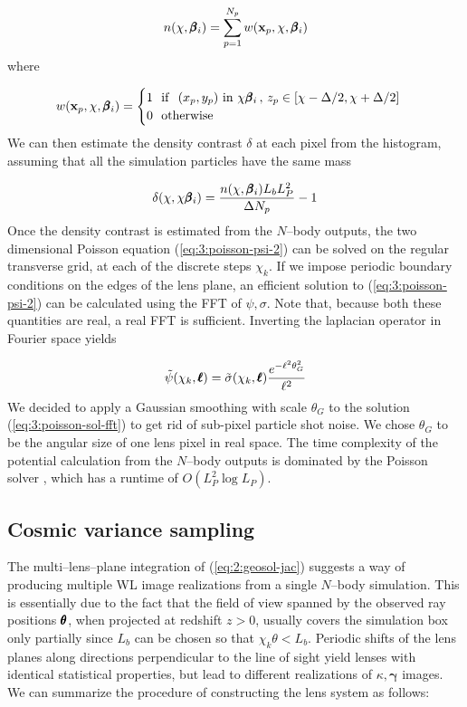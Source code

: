 \begin{equation}
\label{eq:3:number-hist}
n(\chi, \pmb{\beta}_i) = \sum_{p=1}^{N_p}w(\mathbf{x}_p,\chi,\pmb{\beta}_i)
\end{equation}  
%
where 

\begin{equation}
\label{eq:3:number-kernel}
w(\mathbf{x}_p,\chi,\pmb{\beta}_i) = 
\begin{cases}
1 \,\,\,\, {\rm if} \,\,\,\, (x_p,y_p) \,\, {\rm in} \,\, \chi\pmb{\beta}_i \, , \, z_p\in [\chi-\Delta/2,\chi+\Delta/2] \\
0 \,\,\,\, {\rm otherwise}
\end{cases}
\end{equation}
%
We can then estimate the density contrast $\delta$ at each pixel from the histogram, assuming that all the simulation particles have the same mass

\begin{equation}
\label{eq:3:delta-hist}
\delta(\chi,\chi\pmb{\beta}_i) = \frac{n(\chi,\pmb{\beta}_i)L_bL_P^2 }{\Delta N_p} - 1
\end{equation}
%
Once the density contrast is estimated from the $N$--body outputs, the two dimensional Poisson equation (\ref{eq:3:poisson-psi-2}) can be solved on the regular transverse grid, at each of the discrete steps $\chi_k$. If we impose periodic boundary conditions on the edges of the lens plane, an efficient solution to (\ref{eq:3:poisson-psi-2}) can be calculated using the FFT of $\psi,\sigma$. Note that, because both these quantities are real, a real FFT is sufficient. Inverting the laplacian operator in Fourier space yields

\begin{equation}
\label{eq:3:poisson-sol-fft}
\tilde{\psi}(\chi_k,\pmb{\ell}) = \tilde{\sigma}(\chi_k,\pmb{\ell})\frac{e^{-\ell^2\theta_G^2}}{\ell^2}
\end{equation} 
%
We decided to apply a Gaussian smoothing with scale $\theta_G$ to the solution (\ref{eq:3:poisson-sol-fft}) to get rid of sub-pixel particle shot noise. We chose $\theta_G$ to be the angular size of one lens pixel in real space. The time complexity of the potential calculation from the $N$--body outputs is dominated by the Poisson solver \citep{lenstools}, which has a runtime of $O(L_P^2\log L_P)$.

\subsection{Cosmic variance sampling}
The multi--lens--plane integration of (\ref{eq:2:geosol-jac}) suggests a way of producing multiple WL image realizations from a single $N$--body simulation. This is essentially due to the fact that the field of view spanned by the observed ray positions $\pmb{\theta}$, when projected at redshift $z>0$, usually covers the simulation box only partially since $L_b$ can be chosen so that $\chi_k\theta<L_b$. Periodic shifts of the lens planes along directions perpendicular to the line of sight yield lenses with identical statistical properties, but lead to different realizations of $\kappa,\pmb{\gamma}$ images. We can summarize the procedure of constructing the lens system as follows:

